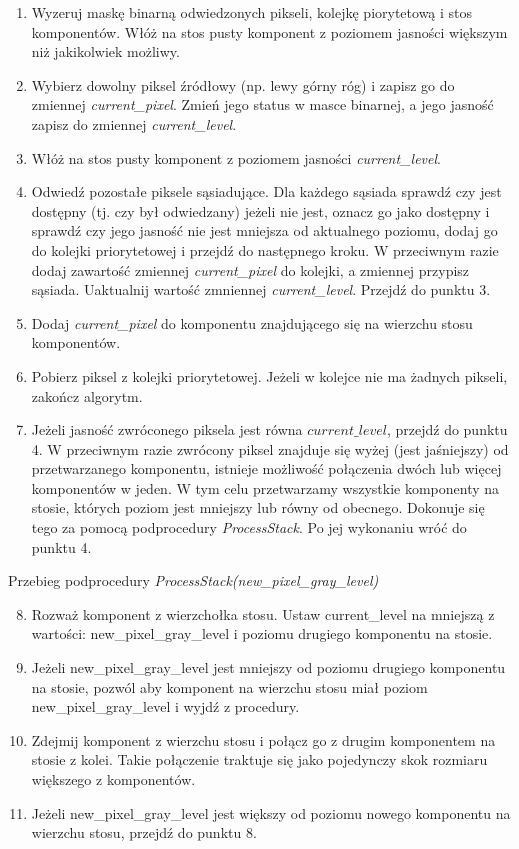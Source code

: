 \begin{enumerate} \item Wyzeruj maskę binarną odwiedzonych pikseli, kolejkę
    piorytetową i stos komponentów. Włóż na stos pusty komponent z poziomem
    jasności większym niż jakikolwiek możliwy. \item Wybierz dowolny piksel
    źródłowy (np. lewy górny róg) i zapisz go do zmiennej
    \textit{current\_pixel}.  Zmień jego status w masce binarnej, a jego
    jasność zapisz do zmiennej \textit{current\_level}. \item Włóż na stos
    pusty komponent z poziomem jasności \textit{current\_level}. \item Odwiedź
    pozostałe piksele sąsiadujące. Dla każdego sąsiada sprawdź czy jest
    dostępny (tj. czy był odwiedzany) jeżeli nie jest, oznacz go jako dostępny
    i sprawdź czy jego jasność nie jest mniejsza od aktualnego poziomu, dodaj
    go do kolejki priorytetowej i przejdź do następnego kroku. W przeciwnym
    razie dodaj zawartość zmiennej \textit{current\_pixel} do kolejki, a
    zmiennej przypisz sąsiada. Uaktualnij wartość zmniennej
    \textit{current\_level}. Przejdź do punktu 3. \item Dodaj
    \textit{current\_pixel} do komponentu znajdującego się na wierzchu stosu
    komponentów. \item Pobierz piksel z kolejki priorytetowej.  Jeżeli w
    kolejce nie ma żadnych pikseli, zakończ algorytm. \item Jeżeli jasność
    zwróconego piksela jest równa $current\_level$, przejdź do punktu 4. W
    przeciwnym razie zwrócony piksel znajduje się wyżej (jest jaśniejszy) od
    przetwarzanego komponentu, istnieje możliwość połączenia dwóch lub więcej
    komponentów w jeden. W tym celu przetwarzamy wszystkie komponenty na
    stosie, których poziom jest mniejszy lub równy od obecnego. Dokonuje się
    tego za pomocą podprocedury \textit{ProcessStack}. Po jej wykonaniu wróć do
    punktu 4.  \end{enumerate}

Przebieg podprocedury \textit{ProcessStack(new\_pixel\_gray\_level)}
\begin{enumerate} \setcounter{enumi}{7} \item Rozważ komponent z wierzchołka
    stosu. Ustaw current\_level na mniejszą z wartości: new\_pixel\_gray\_level
    i poziomu drugiego komponentu na stosie. \item Jeżeli
    new\_pixel\_gray\_level jest mniejszy od poziomu drugiego komponentu na
    stosie, pozwól aby komponent na wierzchu stosu miał poziom
    new\_pixel\_gray\_level i wyjdź z procedury.  \item Zdejmij komponent z
    wierzchu stosu i połącz go z drugim komponentem na stosie z kolei.  Takie
    połączenie traktuje się jako pojedynczy skok rozmiaru większego z
    komponentów.  \item Jeżeli new\_pixel\_gray\_level jest większy od poziomu
    nowego komponentu na wierzchu stosu, przejdź do punktu 8.  \end{enumerate}

